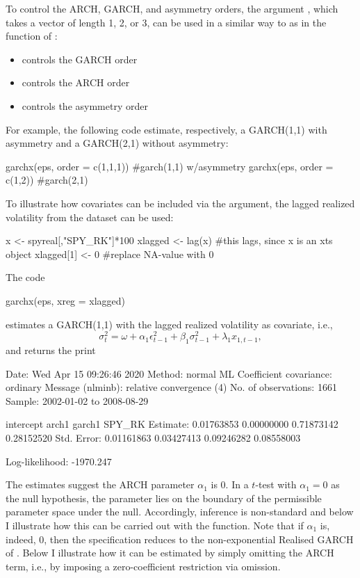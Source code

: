To control the ARCH, GARCH, and asymmetry orders, the argument , which takes a vector of length 1, 2, or 3, can be used in a similar way to as in the  function of :
%
\begin{itemize}
	\item {} controls the GARCH order
	\item {} controls the ARCH order
	\item {} controls the asymmetry order	
\end{itemize}
%
For example, the following code estimate, respectively, a GARCH(1,1) with asymmetry and a GARCH(2,1) without asymmetry:
%
\begin{example}
	garchx(eps, order = c(1,1,1))  #garch(1,1) w/asymmetry
	garchx(eps, order = c(1,2))    #garch(2,1)
\end{example}
%
To illustrate how covariates can be included via the  argument, the lagged realized volatility from the  dataset can be used:
%
\begin{example}
	x <- spyreal[,"SPY_RK"]*100
	xlagged <- lag(x)  #this lags, since x is an xts object
	xlagged[1] <- 0    #replace NA-value with 0
\end{example}
%
The code
%
\begin{example}
	garchx(eps, xreg = xlagged)
\end{example}
%
estimates a GARCH(1,1) with the lagged realized volatility as covariate, i.e.,
%
\begin{equation}\label{eq:garch(1,1):with:xlagged}
	\sigma_t^2 = \omega + \alpha_1 \epsilon_{t-1}^2 + \beta_1 \sigma_{t-1}^2 + \lambda_1 x_{1,t-1},
\end{equation}
%
and returns the print
%
\begin{example}
	Date: Wed Apr 15 09:26:46 2020 
	Method: normal ML
	Coefficient covariance: ordinary 
	Message (nlminb): relative convergence (4) 
	No. of observations: 1661 
	Sample: 2002-01-02 to 2008-08-29 
	
	             intercept      arch1     garch1     SPY_RK
	Estimate:   0.01763853 0.00000000 0.71873142 0.28152520
	Std. Error: 0.01161863 0.03427413 0.09246282 0.08558003
	
	Log-likelihood: -1970.247
\end{example}
%
The estimates suggest the ARCH parameter $\alpha_1$ is 0. In a $t$-test with $\alpha_1=0$ as the null hypothesis, the parameter lies on the boundary of the permissible parameter space under the null. Accordingly, inference is non-standard and below I illustrate how this can be carried out with the  function. Note that if $\alpha_1$ is, indeed, 0, then the specification reduces to the non-exponential Realised GARCH of \citet{HansenHuangSchek2012}. Below I illustrate how it can be estimated by simply omitting the ARCH term, i.e., by imposing a zero-coefficient restriction via omission.

